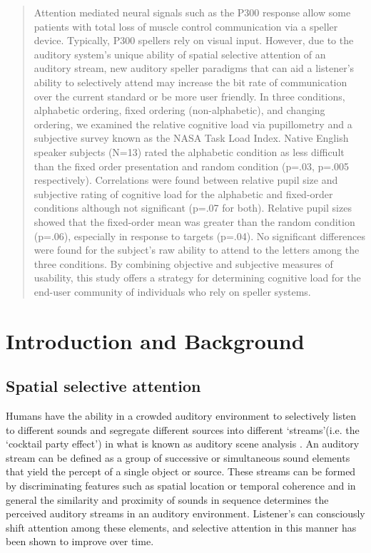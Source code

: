 \documentclass[10pt]{article}
\begin{document}
\begin{abstract}

    Attention mediated neural signals such as the P300
    response allow some patients with total loss of muscle
    control communication via a speller device.  Typically,
    P300 spellers rely on visual input.  However, due to the
    auditory system's unique ability of spatial selective
    attention of an auditory stream, new auditory speller
    paradigms that can aid a listener's ability to selectively
    attend may increase the bit rate of communication over the
    current standard or be more user friendly.  In three
    conditions, alphabetic ordering, fixed ordering
    (non-alphabetic), and changing ordering, we examined the
    relative cognitive load via pupillometry and a subjective
    survey known as the NASA Task Load Index.  Native English
    speaker subjects (N=13) rated the alphabetic condition as
    less difficult than the fixed order presentation and
    random condition (p=.03, p=.005 respectively).
    Correlations were found between relative pupil size and
    subjective rating of cognitive load for the alphabetic and
    fixed-order conditions although not significant (p=.07 for
    both).  Relative pupil sizes showed that the fixed-order
    mean was greater than the random condition (p=.06),
    especially in response to targets (p=.04). No significant
    differences were found for the subject's raw ability to
    attend to the letters among the three conditions. By
    combining objective and subjective measures of usability,
    this study offers a strategy for determining cognitive
    load for the end-user community of individuals who rely on
    speller systems.

\end{abstract}



\section{Introduction and Background}
\subsection{Spatial selective attention} 
Humans have the ability in a crowded auditory environment to
selectively listen to different sounds and segregate different
sources into different \lq streams\rq (i.e. the \lq cocktail
party effect\rq) in what is known as auditory scene analysis
\cite{Bregman1994}. An auditory stream can be defined as a group of
successive or simultaneous sound elements that yield the percept of
a single object or source\cite{Moore2012}. These streams can be formed by
discriminating features such as spatial location or
temporal coherence and in general the similarity and proximity of
sounds in sequence determines the perceived auditory streams in an
auditory environment\cite{Bregman1994}.  Listener's can consciously
shift attention among these elements, and selective attention in
this manner has been shown to improve over time\cite{Best2008}.
\end{document}
